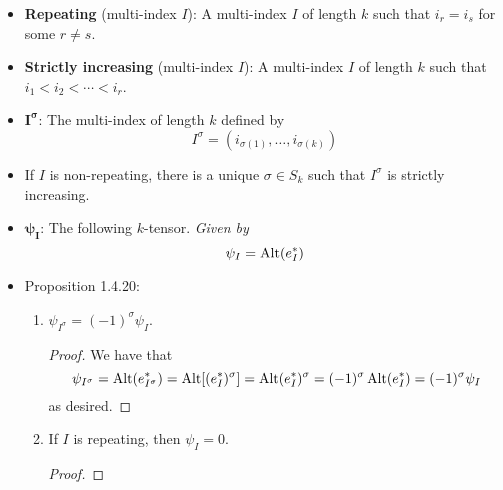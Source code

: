\documentclass[../notes.tex]{subfiles}
\begin{document}
\begin{itemize}
\begin{enumerate}
\begin{proof}
\begin{equation*}
                \Alt(T^\sigma) = \sum_{\tau\in S_k}(-1)^\tau T^{\tau\sigma}
                = (-1)^\sigma\sum_{\tau\in S_k}(-1)^{\tau\sigma}T^{\tau\sigma}
                = (-1)^\sigma\Alt(T)
                = \Alt(T)^\sigma
            \end{equation*}
            as desired.
        \end{proof}
        \item The alternation operation is linear.
        \begin{proof}
            Follows by Proposition 1.4.14.
        \end{proof}
    \end{enumerate}
    \item \textbf{Repeating} (multi-index $I$): A multi-index $I$ of length $k$ such that $i_r=i_s$ for some $r\neq s$.
    \item \textbf{Strictly increasing} (multi-index $I$): A multi-index $I$ of length $k$ such that $i_1<i_2<\cdots<i_r$.
    \item $\bm{I^\sigma}$: The multi-index of length $k$ defined by
    \begin{equation*}
        I^\sigma = (i_{\sigma(1)},\dots,i_{\sigma(k)})
    \end{equation*}
    \item If $I$ is non-repeating, there is a unique $\sigma\in S_k$ such that $I^\sigma$ is strictly increasing.
    \item $\bm{\psi_I}$: The following $k$-tensor. \emph{Given by}
    \begin{equation*}
        \psi_I = \operatorname{Alt}(e_I^*)
    \end{equation*}
    \item Proposition 1.4.20:
    \begin{enumerate}
        \item $\psi_{I^\sigma}=(-1)^\sigma\psi_I$.
        \begin{proof}
            We have that
            \begin{equation*}
                \psi_{I^\sigma} = \operatorname{Alt}(e_{I^\sigma}^*)
                = \operatorname{Alt}[(e_I^*)^\sigma]
                = \operatorname{Alt}(e_I^*)^\sigma
                = (-1)^\sigma\operatorname{Alt}(e_I^*)
                = (-1)^\sigma\psi_I
            \end{equation*}
            as desired.
        \end{proof}
        \item If $I$ is repeating, then $\psi_I=0$.
        \begin{proof}

\end{proof}
\end{enumerate}
\end{itemize}
\end{document}
